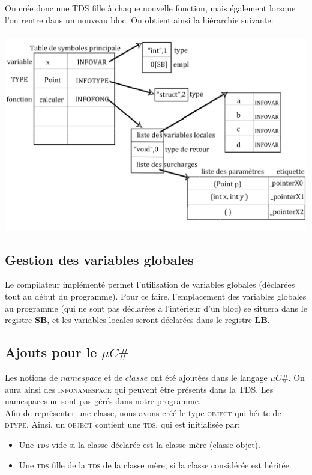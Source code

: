 \documentclass[11pt,a4paper]{report}
\begin{document}
On crée donc une TDS fille à chaque nouvelle fonction, mais également lorsque l'on rentre dans un nouveau bloc. On obtient ainsi la hiérarchie suivante: \\\\

\includegraphics[scale=0.2]{structureMicroC.jpg}

\subsection{Gestion des variables globales}

Le compilateur implémenté permet l'utilisation de variables globales (déclarées tout au début du programme). Pour ce faire, l'emplacement des variables globales au programme (qui ne sont pas déclarées à l'intérieur d'un bloc) se situera dans le registre {\bf SB}, et les variables locales seront déclarées dans le registre {\bf LB}.

\subsection{Ajouts pour le $\mu C \#$}

Les notions de  $namespace$ et de $classe$ ont été ajoutées dans le langage $\mu C \#$. On aura ainsi des \textsc{infonamespace} qui peuvent être présents dans la TDS. Les namespaces ne sont pas gérés dans notre programme.\\

Afin de représenter une classe, nous avons créé le type \textsc{object} qui hérite de \textsc{dtype}. 
Ainsi, un \textsc{object} contient une \textsc{tds}, qui est initialisée par: 
\begin{itemize}
\item Une \textsc{tds} vide si la classe déclarée est la classe mère (classe objet). 
\item Une \textsc{tds} fille de la \textsc{tds} de la classe mère, si la classe considérée est héritée.
\end{itemize}
\end{document}

